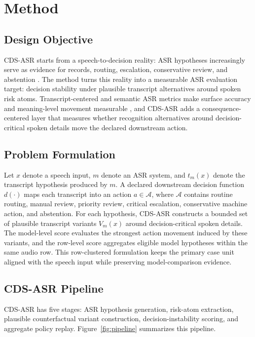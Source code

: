 \section{Method}

\subsection{Design Objective}

CDS-ASR starts from a speech-to-decision reality: ASR hypotheses increasingly serve as evidence for records, routing, escalation, conservative review, and abstention \citep{hodgson2016risks,blackley2019speech}. The method turns this reality into a measurable ASR evaluation target: decision stability under plausible transcript alternatives around spoken risk atoms. Transcript-centered and semantic ASR metrics make surface accuracy and meaning-level movement measurable \citep{roy2021semantic,kim2022semdist}, and CDS-ASR adds a consequence-centered layer that measures whether recognition alternatives around decision-critical spoken details move the declared downstream action.

\subsection{Problem Formulation}

Let $x$ denote a speech input, $m$ denote an ASR system, and $\hat{t}_m(x)$ denote the transcript hypothesis produced by $m$. A declared downstream decision function $d(\cdot)$ maps each transcript into an action $a \in \mathcal{A}$, where $\mathcal{A}$ contains routine routing, manual review, priority review, critical escalation, conservative machine action, and abstention. For each hypothesis, CDS-ASR constructs a bounded set of plausible transcript variants $V_m(x)$ around decision-critical spoken details. The model-level score evaluates the strongest action movement induced by these variants, and the row-level score aggregates eligible model hypotheses within the same audio row. This row-clustered formulation keeps the primary case unit aligned with the speech input while preserving model-comparison evidence.

\subsection{CDS-ASR Pipeline}

CDS-ASR has five stages: ASR hypothesis generation, risk-atom extraction, plausible counterfactual variant construction, decision-instability scoring, and aggregate policy replay. Figure~\ref{fig:pipeline} summarizes this pipeline.


